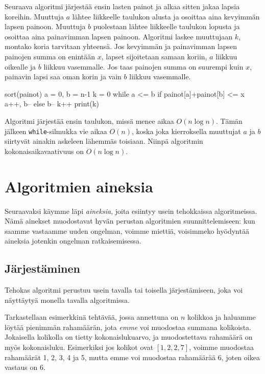Seuraava algoritmi järjestää ensin lasten painot ja alkaa sitten
jakaa lapsia koreihin.
Muuttuja $a$ lähtee liikkeelle taulukon alusta ja
osoittaa aina kevyimmän lapsen painoon.
Muuttuja $b$ puolestaan lähtee liikkeelle taulukon lopusta ja
osoittaa aina painavimman lapsen painoon.
Algoritmi laskee muuttujaan $k$, montako koria tarvitaan yhteensä.
Jos kevyimmän ja painavimman lapsen
painojen summa on enintään $x$, lapset sijoitetaan samaan koriin,
$a$ liikkuu oikealle ja $b$ liikkuu vasemmalle.
Jos taas painojen summa on suurempi kuin $x$,
painavin lapsi saa oman korin ja vain $b$ liikkuu vasemmalle.

\begin{code}
sort(painot)
a = 0, b = n-1
k = 0
while a <= b
    if painot[a]+painot[b] <= x
        a++, b--
    else
        b--
    k++
print(k)
\end{code}

Algoritmi järjestää ensin taulukon, missä menee aikaa $O(n \log n)$.
Tämän jälkeen \texttt{while}-silmukka vie aikaa $O(n)$,
koska joka kierroksella muuttujat $a$ ja $b$ siirtyvät
ainakin askeleen lähemmäs toisiaan.
Niinpä algoritmin kokonais\-aikavaativuus on $O(n \log n)$.

\section{Algoritmien aineksia}

Seuraavaksi käymme läpi \emph{aineksia},
joita esiintyy usein tehokkaissa algoritmeissa.
Nämä ainekset muodostavat hyvän perustan algoritmien
suunnittelemiseen: kun saamme vastaamme uuden ongelman,
voimme miettiä, voisimmeko hyödyntää aineksia jotenkin
ongelman ratkaisemisessa.

\subsection{Järjestäminen}


Tehokas algoritmi perustuu usein tavalla tai
toisella järjestämiseen, joka voi näyttäytyä
monella tavalla algoritmissa.

Tarkastellaan esimerkkinä tehtävää, jossa annettuna on
$n$ kolikkoa ja haluamme löytää pienimmän rahamäärän,
jota \emph{emme} voi muodostaa summana kolikoista.
Jokaisella kolikolla on tietty kokonaislukuarvo, ja
muodostettava rahamäärä on myös kokonaisluku.
Esimerkiksi jos kolikot ovat $[1,2,2,7]$,
voimme muodostaa rahamäärät 1, 2, 3, 4 ja 5,
mutta emme voi muodostaa rahamäärää 6,
joten oikea vastaus on 6.

